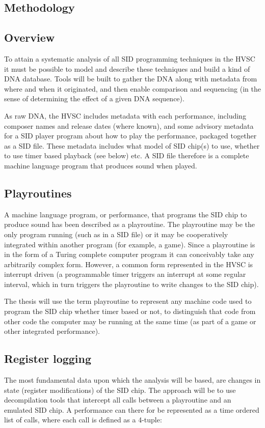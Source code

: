 \documentclass[10pt]{article}
\begin{document}
\begin{multicols*}{2}
  \section{Methodology}

  \subsection{Overview}
  To attain a systematic analysis of all SID programming techniques
  in the HVSC it must be possible to model and describe these
  techniques and build a kind of DNA database. Tools will be built
  to gather the DNA along with metadata from where and when it
  originated, and then enable comparison and sequencing (in
  the sense of determining the effect of a given DNA sequence).

  As raw DNA, the HVSC includes metadata with each performance,
  including composer names and release dates (where known), and some
  advisory metadata for a SID player program about how to play the
  performance, packaged together as a SID file. These metadata
  includes what model of SID chip(s) to use, whether to use timer
  based playback (see below) etc. A SID file therefore is a complete
  machine language program that produces sound when played.

  \subsection{Playroutines}
  A machine language program, or performance, that programs the SID
  chip to produce sound has been described as a playroutine.  The
  playroutine may be the only program running (such as in a SID file)
  or it may be cooperatively integrated within another program (for
  example, a game). Since a playroutine is in the form of a Turing
  complete computer program it can conceivably take any arbitrarily
  complex form. However, a common form represented in the HVSC is
  interrupt driven (a programmable timer triggers an interrupt at some
  regular interval, which in turn triggers the playroutine to write
  changes to the SID chip).

  The thesis will use the term playroutine to represent any machine
  code used to program the SID chip whether timer based or not, to
  distinguish that code from other code the computer may be running at
  the same time (as part of a game or other integrated performance).

  \subsection{Register logging}
  The most fundamental data upon which the analysis will be based,
  are changes in state (register modifications) of the SID chip. The
  approach will be to use decompilation tools that intercept all calls
  between a playroutine and an emulated SID chip. A performance can
  there for be represented as a time ordered list of calls, where each
  call is defined as a 4-tuple:


\end{multicols*}
\end{document}
